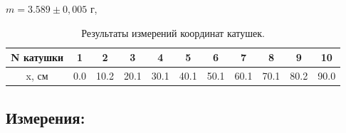 \documentclass[
	a4paper, %
	12pt, %
]{article}
\begin{document}
	$m = 3.589\pm 0,005$ г,\\
	
	\begin{table}[h]
		\centering
		\begin{tabular}{|c|c|c|c|c|c|c|c|c|c|c|}
			\hline
			N катушки & 1 & 2 & 3 & 4 & 5 & 6 & 7 & 8 & 9 & 10  \\
			\hline
			x, см & 0.0 & 10.2 & 20.1 & 30.1 & 40.1 & 50.1 & 60.1 & 70.1 & 80.2 & 90.0 \\
			\hline
		\end{tabular}
		\caption{Результаты измерений координат катушек.}
		\label{table:1}
	\end{table}
	
	\subsection{Измерения:}

	
	
\end{document}
